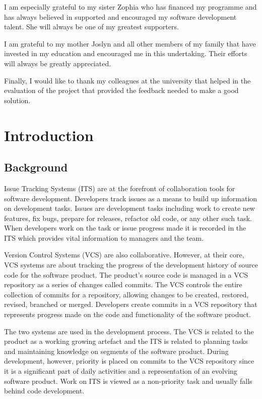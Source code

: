 \documentclass{mproj}
\begin{document}
I am especially grateful to my sister Zophia who has financed my programme and has always believed in supported and encouraged my software development talent. She will always be one of my greatest supporters.

I am grateful to my mother Joslyn and all other members of my family that have invested in my education and encouraged me in this undertaking. Their efforts will always be greatly appreciated.

Finally, I would like to thank my colleagues at the university that helped in the evaluation of the project that provided the feedback needed to make a good solution.

\tableofcontents




\chapter{Introduction}\label{intro}

\section{Background}

Issue Tracking Systems (ITS) are at the forefront of collaboration tools for software development. Developers track issues as a means to build up information on development tasks. Issues are development tasks including work to create new features, fix bugs, prepare for releases, refactor old code, or any other such task. When developers work on the task or issue progress made it is recorded in the ITS which provides vital information to managers and the team.

Version Control Systems (VCS) are also collaborative. However, at their core, VCS systems are about tracking the progress of the development history of source code for the software product. The product’s source code is managed in a VCS repository as a series of changes called commits. The VCS controls the entire collection of commits for a repository, allowing changes to be created, restored, revised, branched or merged. Developers create commits in a VCS repository that represents progress made on the code and functionality of the software product.

The two systems are used in the development process. The VCS is related to the product as a working growing artefact and the ITS is related to planning tasks and maintaining knowledge on segments of the software product. During development, however, priority is placed on commits to the VCS repository since it is a significant part of daily activities and a representation of an evolving software product. Work on ITS is viewed as a non-priority task and usually falls behind code development.
\end{document}
